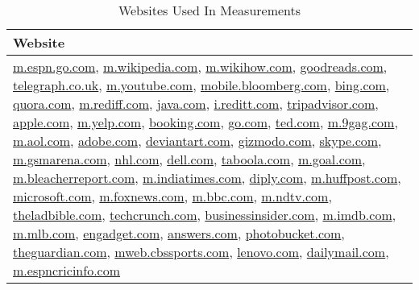 \documentclass{sig-alternate-10pt}
\begin{document}
 



\appendix

\begin{table} [h]  
\centering
 \begin{tabular}{|>{\centering\arraybackslash}p{8cm}|}  \hline
Website \\\hline
  \url{m.espn.go.com}, \url{m.wikipedia.com},  \url{m.wikihow.com}, \url{goodreads.com}, \url{telegraph.co.uk}, \url{m.youtube.com}, \url{mobile.bloomberg.com}, \url{bing.com}, \url{quora.com}, \url{m.rediff.com}, \url{java.com}, \url{i.reditt.com}, \url{tripadvisor.com}, \url{apple.com}, \url{m.yelp.com}, \url{booking.com}, \url{go.com}, \url{ted.com}, \url{m.9gag.com}, \url{m.aol.com}, \url{adobe.com}, \url{deviantart.com}, \url{gizmodo.com}, \url{skype.com}, \url{m.gsmarena.com}, \url{nhl.com}, \url{dell.com}, \url{taboola.com}, \url{m.goal.com}, \url{m.bleacherreport.com}, \url{m.indiatimes.com}, \url{diply.com}, \url{m.huffpost.com}, \url{microsoft.com}, \url{m.foxnews.com}, \url{m.bbc.com}, \url{m.ndtv.com}, \url{theladbible.com}, \url{techcrunch.com}, \url{businessinsider.com}, \url{m.imdb.com}, \url{m.mlb.com}, \url{engadget.com}, \url{answers.com}, \url{photobucket.com}, \url{theguardian.com}, \url{mweb.cbssports.com}, \url{lenovo.com}, \url{dailymail.com}, \url{m.espncricinfo.com}  \\\hline
\end{tabular}
\caption{Websites Used In Measurements}
\label{table-redirections}
\end{table}
\balancecolumns
\end{document}
